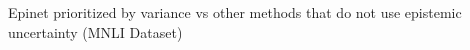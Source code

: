 \documentclass[preview]{standalone}
\begin{document}
\begin{center}
Epinet prioritized by variance vs other methods that do not use epistemic uncertainty (MNLI Dataset)
\end{center}
\end{document}
